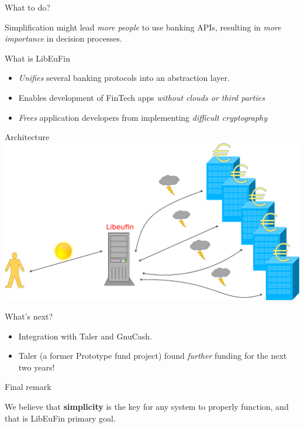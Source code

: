 \documentclass[pdf]{beamer}
\begin{document}
\begin{frame}{What to do?}
  \begin{center}
  Simplification might lead {\it more people} to use banking APIs,
  resulting in {\it more importance} in decision processes.
  \end{center}
\end{frame}

\begin{frame}{What is LibEuFin}
  \begin{itemize}
  \item {\it Unifies} several banking protocols into an abstraction layer.
  \item Enables development of FinTech apps {\it without clouds or third parties}
  \item {\it Frees} application developers from implementing {\it difficult cryptography}
  \end{itemize}
\end{frame}

\begin{frame}{Architecture}
  \includegraphics[height=0.63\textheight]{libeufin.png}
\end{frame}

\begin{frame}{What's next?}
  \begin{itemize}
    \item Integration with Taler and GnuCash.
    \item Taler (a former Prototype fund project) found {\it further} funding for the next two years!
  \end{itemize}
\end{frame}

\begin{frame}{Final remark}
  \begin{center}
  We believe that \textbf{simplicity} is the key for any system to
  properly function, and that is LibEuFin primary goal.
  \end{center}
\end{frame}
\end{document}
